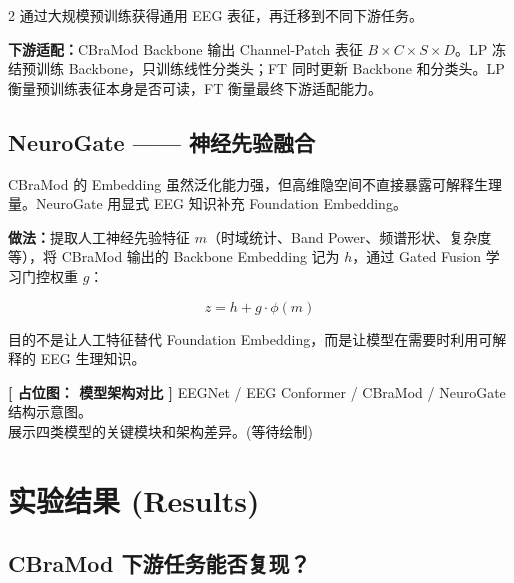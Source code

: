 \documentclass[12pt, a0paper]{article}
\renewcommand{\Large}{\fontsize{34}{42}\selectfont}
\renewcommand{\small}{\fontsize{18}{24}\selectfont}
\newcommand{\placeholder}[2]{%
    \begin{center}
    \colorbox{mygray!12}{\parbox{0.9\columnwidth}{%
        \centering
        \vspace{1.5em}
        {\Large\bfseries\color{mygray} [ 占位图： #1 ]}
        \vspace{0.8em}
        {\small\color{mygray} #2}
        \vspace{1.5em}
    }}
    \end{center}
}
\begin{document}
\begin{multicols}{2}
通过大规模预训练获得通用 EEG 表征，再迁移到不同下游任务。

\textbf{下游适配：}CBraMod Backbone 输出 Channel-Patch 表征 $B \times C \times S \times D$。LP 冻结预训练 Backbone，只训练线性分类头；FT 同时更新 Backbone 和分类头。LP 衡量预训练表征本身是否可读，FT 衡量最终下游适配能力。

\vspace{1em}

\subsection{NeuroGate —— 神经先验融合}

CBraMod 的 Embedding 虽然泛化能力强，但高维隐空间不直接暴露可解释生理量。NeuroGate 用显式 EEG 知识补充 Foundation Embedding。

\textbf{做法：}提取人工神经先验特征 $m$（时域统计、Band Power、频谱形状、复杂度等），将 CBraMod 输出的 Backbone Embedding 记为 $h$，通过 Gated Fusion 学习门控权重 $g$：

\[
z = h + g \cdot \phi(m)
\]

目的不是让人工特征替代 Foundation Embedding，而是让模型在需要时利用可解释的 EEG 生理知识。

\placeholder{模型架构对比}{%
    EEGNet / EEG Conformer / CBraMod / NeuroGate 结构示意图。\\
    展示四类模型的关键模块和架构差异。\quad (等待绘制)}

\section{实验结果 (Results)}

\subsection{CBraMod 下游任务能否复现？}


\end{multicols}
\end{document}
